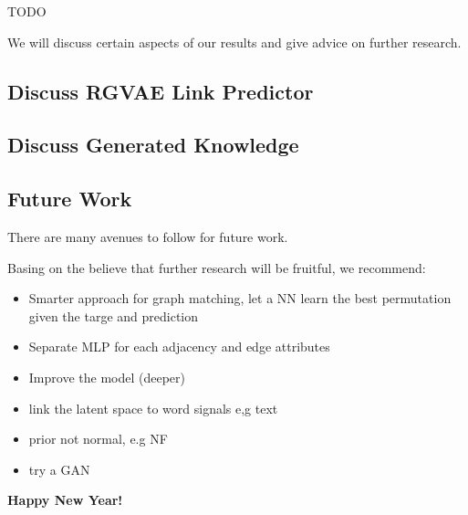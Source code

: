 
TODO

We will discuss certain aspects of our results and give advice on further research.

\subsection{Discuss RGVAE Link Predictor}


\subsection{Discuss Generated Knowledge}


\subsection{Future Work}

There are many avenues to follow for future work.

Basing on the believe that further research will be fruitful, we recommend:

\begin{itemize}
    \item Smarter approach for graph matching, let a NN learn the best permutation given the targe and prediction
    \item Separate MLP for each adjacency and edge attributes
    \item Improve the model (deeper)
    \item link the latent space to word signals e,g text
    \item prior not normal, e.g NF
    \item try a GAN
\end{itemize}

\textbf{Happy New Year!}
